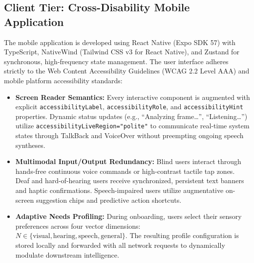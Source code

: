 \documentclass[10pt,a4paper]{article}
\begin{document}
\subsection{Client Tier: Cross-Disability Mobile Application}
The mobile application is developed using React Native (Expo SDK 57) with TypeScript, NativeWind (Tailwind CSS v3 for React Native), and Zustand for synchronous, high-frequency state management. The user interface adheres strictly to the Web Content Accessibility Guidelines (WCAG 2.2 Level AAA) and mobile platform accessibility standards:
\begin{itemize}
    \item \textbf{Screen Reader Semantics:} Every interactive component is augmented with explicit \texttt{accessibilityLabel}, \texttt{accessibilityRole}, and \texttt{accessibilityHint} properties. Dynamic status updates (e.g., ``Analyzing frame\dots'', ``Listening\dots'') utilize \texttt{accessibilityLiveRegion="polite"} to communicate real-time system states through TalkBack and VoiceOver without preempting ongoing speech syntheses.
    \item \textbf{Multimodal Input/Output Redundancy:} Blind users interact through hands-free continuous voice commands or high-contrast tactile tap zones. Deaf and hard-of-hearing users receive synchronized, persistent text banners and haptic confirmations. Speech-impaired users utilize augmentative on-screen suggestion chips and predictive action shortcuts.
    \item \textbf{Adaptive Needs Profiling:} During onboarding, users select their sensory preferences across four vector dimensions: $N \in \{\text{visual}, \text{hearing}, \text{speech}, \text{general}\}$. The resulting profile configuration is stored locally and forwarded with all network requests to dynamically modulate downstream intelligence.
\end{itemize}
\end{document}
